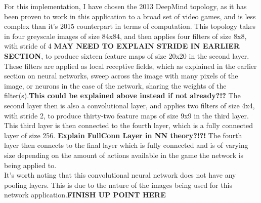 \documentclass[10pt]{article}
\begin{document}
		For this implementation, I have chosen the 2013 DeepMind topology, as it has been proven to work in this application to a broad set of video games, and is less complex than it's 2015 counterpart in terms of computation. This topology takes in four greyscale images of size 84x84, and then applies four filters of size 8x8, with stride of 4 \textbf{MAY NEED TO EXPLAIN STRIDE IN EARLIER SECTION}, to produce sixteen feature maps of size 20x20 in the second layer. These filters are applied as local receptive fields, which as explained in the earlier section on neural networks, sweep across the image with many pixels of the image, or neurons in the case of the network, sharing the weights of the filter(s).\textbf{This could be explained above instead if not already?!?} The second layer then is also a convolutional layer, and applies two filters of size 4x4, with stride 2, to produce thirty-two feature maps of size 9x9 in the third layer. This third layer is then connected to the fourth layer, which is a fully connected layer of size 256. \textbf{Explain FullConn Layer in NN theory?!?!} The fourth layer then connects to the final layer which is fully connected and is of varying size depending on the amount of actions available in the game the network is being applied to.\\
		
		It's worth noting that this convolutional neural network does not have any pooling layers. This is due to the nature of the images being used for this network application.\textbf{FINISH UP POINT HERE}\\
		
\end{document}
